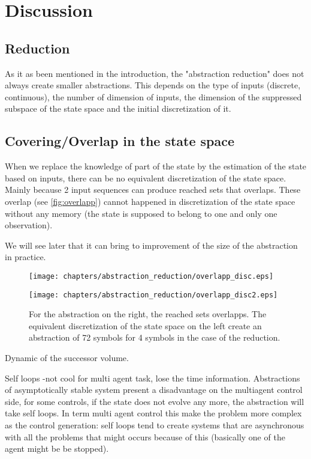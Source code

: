 \section{Discussion}

\subsection{Reduction}
As it as been mentioned in the introduction, the "abstraction reduction" does not always create smaller abstractions.
This depends on the type of inputs (discrete, continuous), the number of dimension of inputs, the dimension of the suppressed subspace of the state space and the initial discretization of it.

\subsection{Covering/Overlap in the state space}
When we replace the knowledge of part of the state by the estimation of the state based on inputs, there can be no equivalent discretization of the state space.
Mainly because 2 input sequences can produce reached sets that overlaps.
These overlap (see \ref{fig:overlapp}) cannot happened in discretization of the state space without any memory (the state is supposed to belong to one and only one observation).

We will see later that it can bring to improvement of the size of the abstraction in practice.

\begin{figure}
\centering
\begin{minipage}[b]{0.49\textwidth}
	\texttt{[image: chapters/abstraction\_reduction/overlapp\_disc.eps]}
\end{minipage}	
\begin{minipage}[b]{0.49\textwidth}
	\texttt{[image: chapters/abstraction\_reduction/overlapp\_disc2.eps]}
\end{minipage}	
\caption{For the abstraction on the right, the reached sets overlapps. The equivalent discretization of the state space on the left create an abstraction of 72 symbols for 4 symbols in the case of the reduction.}
\end{figure}

Dynamic of the successor volume.

Self loops -not cool for multi agent task, lose the time information.
Abstractions of asymptotically stable system present a disadvantage on the multiagent control side, for some controls, if the state does not evolve any more, the abstraction will take self loops.
In term multi agent control this make the problem more complex as the control generation: self loops tend to create systems that are asynchronous with all the problems that might occurs because of this (basically one of the agent might be be stopped).

